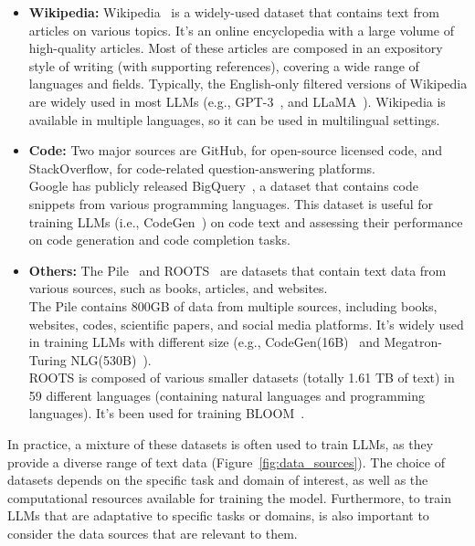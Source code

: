 \begin{itemize}
{	      }
	\item \textbf{Wikipedia:} {
		      Wikipedia~\cite{wikipedia} is a widely-used dataset that contains text from articles on various topics. It's an online encyclopedia with a large volume of high-quality articles. Most of these articles are composed in an expository style of writing (with supporting references), covering a wide range of languages and fields.
		      Typically, the English-only filtered versions of Wikipedia are widely used in most LLMs (e.g., GPT-3~\cite{brown2020language}, and LLaMA~\cite{touvron2023llama}).
		      Wikipedia is available in multiple languages, so it can be used in multilingual settings.
	      }
	\item \textbf{Code:} {
		      Two major sources are GitHub, for open-source licensed code, and StackOverflow, for code-related question-answering platforms.\\
		      Google has publicly released BigQuery~\cite{bigquerydataset}, a dataset that contains code snippets from various programming languages. This dataset is useful for training LLMs (i.e., CodeGen~\cite{nijkamp2022codegen}) on code text and assessing their performance on code generation and code completion tasks.
	      }
	\item \textbf{Others:} {
		      The Pile~\cite{gao2021pile} and ROOTS~\cite{laurencon2022bigscience} are datasets that contain text data from various sources, such as books, articles, and websites.\\
		      The Pile contains 800GB of data from multiple sources, including books, websites, codes, scientific papers, and social media platforms. It's widely used in training LLMs with different size (e.g., CodeGen(16B)~\cite{nijkamp2022codegen} and Megatron-Turing NLG(530B)~\cite{smith2022deepspeed}).\\
		      ROOTS is composed of various smaller datasets (totally 1.61 TB of text) in 59 different languages (containing natural languages and programming languages). It's been used for training BLOOM~\cite{workshop2023bloom}.
	      }
\end{itemize}

In practice, a mixture of these datasets is often used to train LLMs, as they provide a diverse range of text data (Figure~\ref{fig:data_sources}).
The choice of datasets depends on the specific task and domain of interest, as well as the computational resources available for training the model.
Furthermore, to train LLMs that are adaptative to specific tasks or domains, is also important to consider the data sources that are relevant to them.\\


